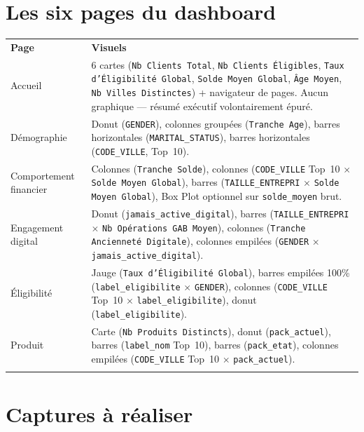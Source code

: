 \documentclass[11pt,a4paper]{report}
\let\oldtoprule\toprule
\renewcommand{\toprule}{\arrayrulecolor{corpslate}\oldtoprule\arrayrulecolor{black}}
\let\oldmidrule\midrule
\renewcommand{\midrule}{\arrayrulecolor{emsigreen}\oldmidrule\arrayrulecolor{black}}
\let\oldbottomrule\bottomrule
\renewcommand{\bottomrule}{\arrayrulecolor{corpslate}\oldbottomrule\arrayrulecolor{black}}
\begin{document}
\section{Les six pages du dashboard}
\begin{center}
\begin{tabular}{@{}p{2.6cm}p{10.4cm}@{}}
\toprule
\textbf{Page} & \textbf{Visuels} \\
\midrule
Accueil & 6 cartes (\texttt{Nb Clients Total}, \texttt{Nb Clients Éligibles}, \texttt{Taux d'Éligibilité Global}, \texttt{Solde Moyen Global}, \texttt{Âge Moyen}, \texttt{Nb Villes Distinctes}) + navigateur de pages. Aucun graphique — résumé exécutif volontairement épuré. \\
Démographie & Donut (\texttt{GENDER}), colonnes groupées (\texttt{Tranche Age}), barres horizontales (\texttt{MARITAL\_STATUS}), barres horizontales (\texttt{CODE\_VILLE}, Top~10). \\
Comportement financier & Colonnes (\texttt{Tranche Solde}), colonnes (\texttt{CODE\_VILLE} Top~10 $\times$ \texttt{Solde Moyen Global}), barres (\texttt{TAILLE\_ENTREPRI} $\times$ \texttt{Solde Moyen Global}), Box Plot optionnel sur \texttt{solde\_moyen} brut. \\
Engagement digital & Donut (\texttt{jamais\_active\_digital}), barres (\texttt{TAILLE\_ENTREPRI} $\times$ \texttt{Nb Opérations GAB Moyen}), colonnes (\texttt{Tranche Ancienneté Digitale}), colonnes empilées (\texttt{GENDER} $\times$ \texttt{jamais\_active\_digital}). \\
Éligibilité & Jauge (\texttt{Taux d'Éligibilité Global}), barres empilées 100\% (\texttt{label\_eligibilite} $\times$ \texttt{GENDER}), colonnes (\texttt{CODE\_VILLE} Top~10 $\times$ \texttt{label\_eligibilite}), donut (\texttt{label\_eligibilite}). \\
Produit & Carte (\texttt{Nb Produits Distincts}), donut (\texttt{pack\_actuel}), barres (\texttt{label\_nom} Top~10), barres (\texttt{pack\_etat}), colonnes empilées (\texttt{CODE\_VILLE} Top~10 $\times$ \texttt{pack\_actuel}). \\
\bottomrule
\end{tabular}
\end{center}

\section{Captures à réaliser}
\end{document}
